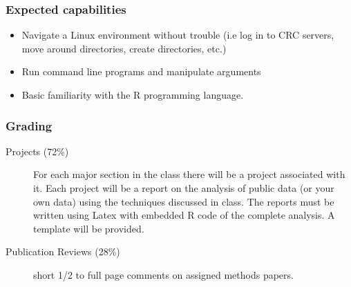 \documentclass[pdf]{beamer}
\begin{document}
\begin{frame}
	\frametitle{Expected capabilities}
	\begin{itemize}
		\item Navigate a Linux environment without trouble (i.e log in to CRC servers, move around directories, create directories, etc.)
		\item Run command line programs and manipulate arguments
		\item Basic familiarity with the R programming language.
	\end{itemize}
\end{frame}
\begin{frame}
	\frametitle{Grading}
	\begin{description}
		\item[Projects (72\%)] For each major section in the class there will be a project associated with it. Each project will be a report on the analysis of public data (or your own data) using the techniques discussed in class. The reports must be written using Latex with embedded R code of the complete analysis. A template will be provided.
		\item[Publication Reviews (28\%)] short 1/2 to full page comments on assigned methods papers. 
	\end{description}
\end{frame}
\end{document}
